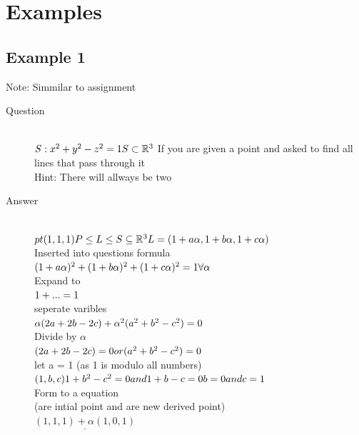 \documentclass[11pt,twoside,a4paper]{article}
\begin{document}
  \clearpage
  \section{Examples}
  
    \subsection{Example 1}
      \label{Example_1_1}
      Note: Simmilar to assignment
      \begin{description}
        \item[Question] \hfill \\
          \(
            S:x^2+y^2-z^2=1 \\
            S\subset\mathbb{R}^3 \\
          \)
          If you are given a point and asked to find all lines that pass through it\\
          Hint: There will allways be two
        
        \item[Answer] \hfill \\
          \(
            pt(1,1,1) \\*
            P \leq L \leq S \subseteq \mathbb{R}^3 \\
            L = (1+a\alpha, 1+b\alpha, 1+c\alpha) \\
          \)
            \\ Inserted into questions formula \\
          \(
            (1+a\alpha)^2 + (1+b\alpha)^2 + (1+c\alpha)^2 = 1  \forall \alpha \\
          \)
            \\ Expand to\\
          \(
            1+ ... = 1 \\
          \)
            \\ seperate varibles \\
          \(
            \alpha(2a+2b-2c)+\alpha^2(a^2+b^2-c^2) = 0 \\
          \)
            \\ Divide by \(\alpha\) \\
          \(
            (2a+2b-2c) = 0 or (a^2+b^2-c^2) = 0 \\
          \)
            \\ let a = 1 (as 1 is modulo all numbers) \\
          \(
            (1,b,c) \\
            1+b^2-c^2 = 0 and 1+b-c=0 \\
            b=0 and c=1 \\
          \)
            \\ Form to a equation \\ (are intial point and are new derived point) \\
          \(
            \underline{(1,1,1) + \alpha(1,0,1)}
          \)
      \end{description}
  
\end{document}
